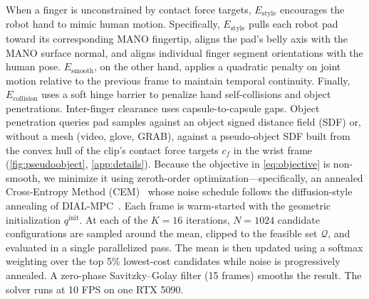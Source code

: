 When a finger is unconstrained by contact force targets, $E_{\mathrm{style}}$ encourages the robot hand to mimic human motion. Specifically, $E_{\mathrm{style}}$ pulls each robot pad toward its corresponding MANO fingertip, aligns the pad's belly axis with the MANO surface normal, and aligns individual finger segment orientations with the human pose. $E_{\mathrm{smooth}}$, on the other hand, applies a quadratic penalty on joint motion relative to the previous frame to maintain temporal continuity. Finally, $E_{\mathrm{collision}}$ uses a soft hinge barrier to penalize hand self-collisions and object penetrations. Inter-finger clearance uses capsule-to-capsule gaps. Object penetration queries pad samples against an object signed distance field (SDF) or, without a mesh (video, glove, GRAB), against a pseudo-object SDF built from the convex hull of the clip's contact force targets $c_f$ in the wrist frame (\cref{fig:pseudoobject}, \cref{app:details}).
 Because the objective in \cref{eq:objective} is non-smooth, we minimize it using zeroth-order optimization---specifically, an annealed Cross-Entropy Method (CEM)~\citep{mppi, icem} whose noise schedule follows the diffusion-style annealing of DIAL-MPC~\citep{dialmpc}. Each frame is warm-started with the geometric initialization $q^{\mathrm{init}}$. At each of the $K = 16$ iterations, $N = 1024$ candidate configurations are sampled around the mean, clipped to the feasible set $\mathcal{Q}$, and evaluated in a single parallelized pass. The mean is then updated using a softmax weighting over the top 5\% lowest-cost candidates while noise is progressively annealed. A zero-phase Savitzky--Golay filter (15 frames) smooths the result. The solver runs at 10 FPS on one RTX 5090.

